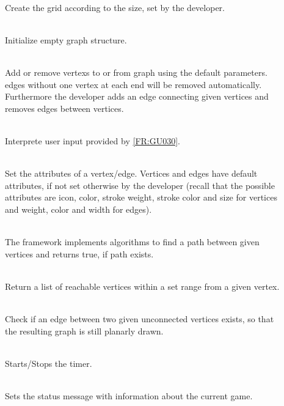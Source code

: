 \begin{description}
	\item[] \textbf{} \\
	Create the grid according to the size, set by the developer.
	\item[] \textbf{} \\
	Initialize empty graph structure.
	\item[] \textbf{} \\
	Add or remove \glspl{vertex} to or from graph using the default parameters. \Glspl{edge} without one vertex at each end will be removed automatically. Furthermore the developer adds an edge connecting given vertices and removes edges between vertices.
	\item[] \textbf{} \\
	Interprete user input provided by \ref{FR:GU030}.
	\item[] \textbf{} \\
	Set the attributes of a vertex/edge. Vertices and edges have default attributes, if not set otherwise by the developer (recall that the possible attributes are icon, color, stroke weight, stroke color and size for vertices and weight, color and width for edges).
	\item[] \textbf{} \\
	The framework implements algorithms to find a \gls{path} between given vertices and returns true, if path exists.
	\item[] \textbf{} \\
	Return a list of reachable vertices within a set range from a given vertex.
	\item[] \textbf{} \\
	Check if an edge between two given unconnected vertices exists, so that the resulting graph is still planarly drawn.
	\item[] \textbf{} \\
	Starts/Stops the timer.
	\item[] \textbf{} \\
	Sets the status message with information about the current game.
\end{description}

